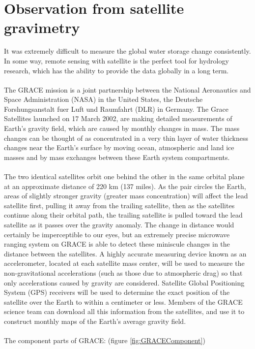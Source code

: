 \section{Observation from satellite gravimetry}
It was extremely difficult to measure the global water storage change consistently. In some way, remote sensing with satellite is the perfect tool for hydrology research, which has the ability to provide the data globally in a long term.\\\\
The GRACE mission is a joint partnership between the National Aeronautics and Space Administration (NASA) in the United States, the Deutsche Forshungsanstalt fuer Luft und Raumfahrt (DLR) in Germany. The Grace Satellites launched on 17 March 2002, are making detailed measurements of Earth's gravity field, which are caused by monthly changes in mass. The mass changes can be thought of as concentrated in a very thin layer of water thickness changes near the Earth's surface by moving ocean, atmospheric and land ice masses and by mass exchanges between these Earth system compartments. \\\\
The two identical satellites orbit one behind the other in the same orbital plane at an approximate distance of 220 km (137 miles). As the pair circles the Earth, areas of slightly stronger gravity (greater mass concentration) will affect the lead satellite first, pulling it away from the trailing satellite, then as the satellites continue along their orbital path, the trailing satellite is pulled toward the lead satellite as it passes over the gravity anomaly. The change in distance would certainly be imperceptible to our eyes, but an extremely precise microwave ranging system on GRACE is able to detect these miniscule changes in the distance between the satellites. A highly accurate measuring device known as an accelerometer, located at each satellite mass center, will be used to measure the non-gravitational accelerations (such as those due to atmospheric drag) so that only accelerations caused by gravity are considered. Satellite Global Positioning System (GPS) receivers will be used to determine the exact position of the satellite over the Earth to within a centimeter or less. Members of the GRACE science team can download all this information from the satellites, and use it to construct monthly maps of the Earth's average gravity field. \\\\
The component parts of GRACE: (figure \ref{fig:GRACEComponent}) \cite{gracecomponent}
